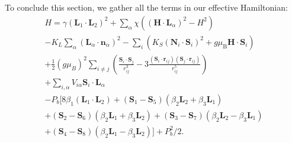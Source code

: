 \\\\
To conclude this section, we gather all the terms in our effective Hamiltonian:
\begin{multline}
    \label{eq:GdMn2O5_model}
    H=\gamma(\bm{L}_1\cdot \bm{L}_2)^2 +\sum_{\alpha}\chi((\bm{H}\cdot \bm{L}_\alpha)^2-H^2)\\
    -K_L\sum_\alpha(\bm{L}_\alpha\cdot \bm{n}_\alpha)^2 -\sum_i\left( K_S(\bm{N}_i\cdot \bm S_i)^2+ g\mu_\mathrm{B} \bm{H} \cdot \bm{S}_i\right) \\
    + \frac{1}{2}(g \mu_B)^2\sum_{i\neq j}\left(\frac{\bm S_i\cdot \bm S_j}{r_{ij}^3}-3\frac{(\bm S_i\cdot \bm{r}_{ij})(\bm S_j\cdot \bm{r}_{ij})}{r_{ij}^5}\right)
     \\+ \sum_{i,\alpha}V_{i\alpha}\bm{S}_i\cdot \bm{L}_\alpha \\
    -P_b[8 \beta_1 (\bm{L}_1\cdot \bm{L}_2)+(\bm{S}_1-\bm{S}_5)(\beta_2 \bm{L}_2 + \beta_3 \bm{L}_1) \\+ (\bm{S}_2-\bm{S}_6)(\beta_2 \bm{L}_1 + \beta_3 \bm{L}_2)
    + (\bm{S}_3-\bm{S}_7)(\beta_2 \bm{L}_2 - \beta_3 \bm{L}_1) \\
    +(\bm{S}_4-\bm{S}_8)(\beta_2 \bm{L}_1 - \beta_3 \bm{L}_2)]
    + P_b^2/2.
\end{multline}

